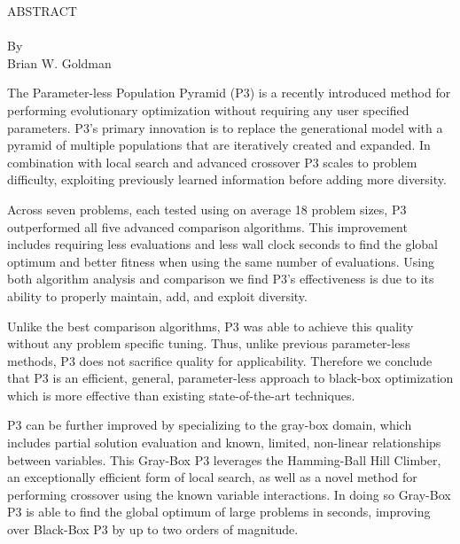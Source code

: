 \thispagestyle{empty} \setcounter{page}{2}
\begin{doublespace}
\begin{centering}
ABSTRACT\\ %
\MyTitle\\ %
By \\ %
Brian W. Goldman\\ %
\end{centering}

The Parameter-less Population Pyramid (P3) is a recently introduced method for performing
evolutionary optimization without requiring any user specified parameters.
P3's primary innovation is to replace the generational model with a pyramid of
multiple populations that are iteratively created and expanded. In combination
with local search and advanced crossover P3 scales to problem difficulty, exploiting
previously learned information before adding more diversity.

Across seven problems, each tested using on average 18 problem sizes, P3 outperformed
all five advanced comparison algorithms. This improvement includes requiring less evaluations
and less wall clock seconds to find the global optimum and better fitness when using
the same number of evaluations. Using both algorithm analysis and comparison we find P3's
effectiveness is due to its ability to properly maintain, add, and exploit diversity.

Unlike the best comparison algorithms, P3 was able to achieve this quality without any
problem specific tuning. Thus, unlike previous parameter-less methods, P3 does not
sacrifice quality for applicability. Therefore we conclude that
P3 is an efficient, general, parameter-less approach to black-box
optimization which is more effective than existing state-of-the-art techniques.

P3 can be further improved by specializing to the gray-box domain, which includes
partial solution evaluation and known, limited, non-linear relationships between variables.
This Gray-Box P3 leverages the Hamming-Ball Hill Climber, an exceptionally efficient
form of local search, as well as a novel method for performing crossover using the
known variable interactions. In doing so Gray-Box P3 is able to find the global
optimum of large problems in seconds, improving over Black-Box P3 by up to
two orders of magnitude.
\end{doublespace}
\newpage
